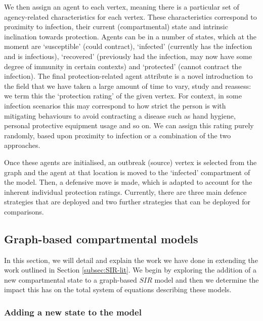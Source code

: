 \documentclass[../report.tex]{subfiles}
\begin{document}
We then assign an agent to each vertex, meaning there is a particular set of agency-related characteristics for each vertex. These characteristics correspond to proximity to infection, their current (compartmental) state and intrinsic inclination towards protection. Agents can be in a number of states, which at the moment are `susceptible' (could contract), `infected' (currently has the infection and is infectious), `recovered' (previously had the infection, may now have some degree of immunity in certain contexts) and `protected' (cannot contract the infection). The final protection-related agent attribute is a novel introduction to the field that we have taken a large amount of time to vary, study and reassess: we term this the `protection rating' of the given vertex. For context, in some infection scenarios this may correspond to how strict the person is with mitigating behaviours to avoid contracting a disease such as hand hygiene, personal protective equipment usage and so on. We can assign this rating purely randomly, based upon proximity to infection or a combination of the two approaches.

Once these agents are initialised, an outbreak (source) vertex is selected from the graph and the agent at that location is moved to the `infected' compartment of the model. Then, a defensive move is made, which is adapted to account for the inherent individual protection ratings. Currently, there are three main defence strategies that are deployed and two further strategies that can be deployed for comparisons.

\subsection{Graph-based compartmental models}

In this section, we will detail and explain the work we have done in extending the work outlined in Section \ref{subsec:SIR-lit}. We begin by exploring the addition of a new compartmental state to a graph-based $SIR$ model and then we determine the impact this has on the total system of equations describing these models.

\subsubsection{Adding a new state to the model}
\end{document}
